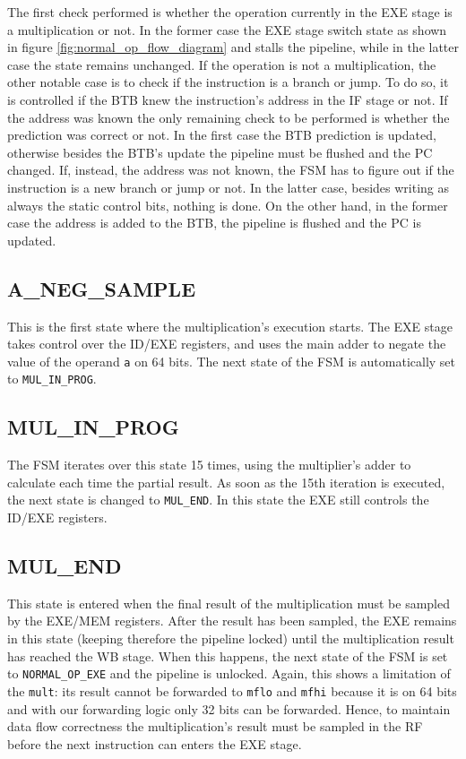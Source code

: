 The first check performed is whether the operation currently in the EXE stage is a multiplication or not. In the former case the EXE stage switch state as shown in figure \ref{fig:normal_op_flow_diagram} and stalls the pipeline,
while in the latter case the state remains unchanged. If the operation is not a multiplication, the other notable case is to check if the instruction is a branch or jump. To do so, it is controlled if the
BTB knew the instruction's address in the IF stage or not. If the address was known the only remaining check to be performed is whether the prediction was correct or not. In the first case the BTB prediction
is updated, otherwise besides the BTB's update the pipeline must be flushed and the PC changed.
If, instead, the address was not known, the FSM has to figure out if the instruction is a new branch or jump or not. In the latter case, besides writing as always the static control bits, nothing is done.
On the other hand, in the former case the address is added to the BTB, the pipeline is flushed and the PC is updated.

\subsection{A\_NEG\_SAMPLE}

This is the first state where the multiplication's execution starts. The EXE stage takes control over the ID/EXE registers, and uses the main adder to negate the value of the operand \verb|a| on 64 bits.
The next state of the FSM is automatically set to \verb|MUL_IN_PROG|.

\subsection{MUL\_IN\_PROG}

The FSM iterates over this state 15 times, using the multiplier's adder to calculate each time the partial result. As soon as the 15th iteration is executed, the next state is changed to \verb|MUL_END|.
In this state the EXE still controls the ID/EXE registers.

\subsection{MUL\_END}

This state is entered when the final result of the multiplication must be sampled by the EXE/MEM registers. After the result has been sampled, the EXE remains in this state (keeping therefore the pipeline locked)
until the multiplication result has reached the WB stage. When this happens, the next state of the FSM is set to \verb|NORMAL_OP_EXE| and the pipeline is unlocked.
Again, this shows a limitation of the \verb|mult|: its result cannot be forwarded to \verb|mflo| and \verb|mfhi| because it is on 64 bits and with our
forwarding logic only 32 bits can be forwarded. Hence, to maintain data flow correctness the multiplication's result must be sampled in the RF before the next instruction can enters the EXE stage.

